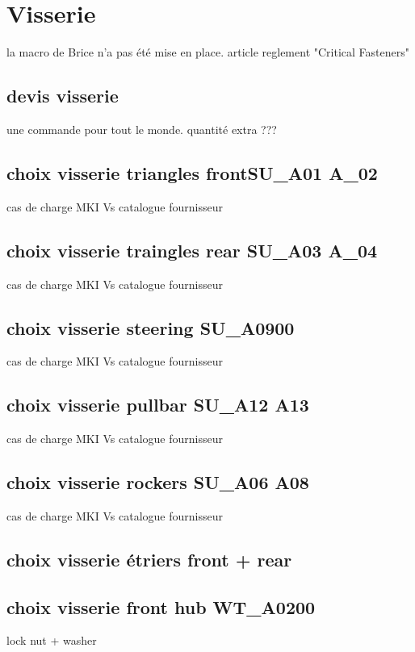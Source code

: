  \section*{Visserie} 
 \par la macro de Brice n'a pas été mise en place. article reglement "Critical Fasteners"
	\subsection*{devis visserie} 
 \par une commande pour tout le monde. quantité extra ???
	\subsection*{choix visserie triangles frontSU\_A01 A\_02} 
 \par cas de charge MKI Vs catalogue fournisseur
	\subsection*{choix visserie traingles rear SU\_A03 A\_04} 
 \par cas de charge MKI Vs catalogue fournisseur
	\subsection*{choix visserie steering SU\_A0900} 
 \par cas de charge MKI Vs catalogue fournisseur
	\subsection*{choix visserie pullbar SU\_A12 A13} 
 \par cas de charge MKI Vs catalogue fournisseur
	\subsection*{choix visserie rockers SU\_A06 A08} 
 \par cas de charge MKI Vs catalogue fournisseur
	\subsection*{choix visserie étriers front + rear} 
 \par 
	\subsection*{choix visserie front hub WT\_A0200} 
 \par lock nut + washer 
